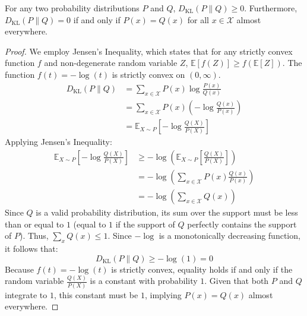 \begin{theorem}
For any two probability distributions $P$ and $Q$, $D_{\text{KL}}(P \parallel Q) \ge 0$. Furthermore, $D_{\text{KL}}(P \parallel Q) = 0$ if and only if $P(x) = Q(x)$ for all $x \in \mathcal{X}$ almost everywhere.
\end{theorem}
\begin{proof}
We employ Jensen's Inequality, which states that for any strictly convex function $f$ and non-degenerate random variable $Z$, $\mathbb{E}[f(Z)] \ge f(\mathbb{E}[Z])$. The function $f(t) = -\log(t)$ is strictly convex on $(0, \infty)$.
\begin{align*}
D_{\text{KL}}(P \parallel Q) &= \sum_{x \in \mathcal{X}} P(x) \log \frac{P(x)}{Q(x)} \\
&= \sum_{x \in \mathcal{X}} P(x) \left( -\log \frac{Q(x)}{P(x)} \right) \\
&= \mathbb{E}_{X \sim P}\left[ -\log \frac{Q(X)}{P(X)} \right]
\end{align*}
Applying Jensen's Inequality:
\begin{align*}
\mathbb{E}_{X \sim P}\left[ -\log \frac{Q(X)}{P(X)} \right] &\ge -\log \left( \mathbb{E}_{X \sim P}\left[ \frac{Q(X)}{P(X)} \right] \right) \\
&= -\log \left( \sum_{x \in \mathcal{X}} P(x) \frac{Q(x)}{P(x)} \right) \\
&= -\log \left( \sum_{x \in \mathcal{X}} Q(x) \right)
\end{align*}
Since $Q$ is a valid probability distribution, its sum over the support must be less than or equal to $1$ (equal to $1$ if the support of $Q$ perfectly contains the support of $P$). Thus, $\sum_x Q(x) \le 1$. Since $-\log$ is a monotonically decreasing function, it follows that:
\begin{equation*}
D_{\text{KL}}(P \parallel Q) \ge -\log(1) = 0
\end{equation*}
Because $f(t) = -\log(t)$ is strictly convex, equality holds if and only if the random variable $\frac{Q(X)}{P(X)}$ is a constant with probability $1$. Given that both $P$ and $Q$ integrate to $1$, this constant must be $1$, implying $P(x) = Q(x)$ almost everywhere.
\end{proof}

